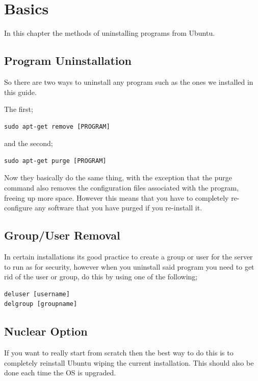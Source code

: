 \chapter{Basics}

In this chapter the methods of uninstalling programs from Ubuntu.

\section{Program Uninstallation}

So there are two ways to uninstall any program such as the ones we installed in this guide.

The first;
\begin{lstlisting}
sudo apt-get remove [PROGRAM]
\end{lstlisting}

and the second;
\begin{lstlisting}
sudo apt-get purge [PROGRAM]
\end{lstlisting}

Now they basically do the same thing, with the exception that the purge command also removes the configuration files associated with the program, freeing up more space.  However this means that you have to completely re-configure any software that you have purged if you re-install it.

\section{Group/User Removal}

In certain installations its good practice to create a group or user for the server to run as for security, however when you uninstall said program you need to get rid of the user or group, do this by using one of the following;

\begin{lstlisting}
deluser [username]
delgroup [groupname]
\end{lstlisting}

\section{Nuclear Option}

If you want to really start from scratch then the best way to do this is to completely reinstall Ubuntu wiping the current installation. This should also be done each time the OS is upgraded.